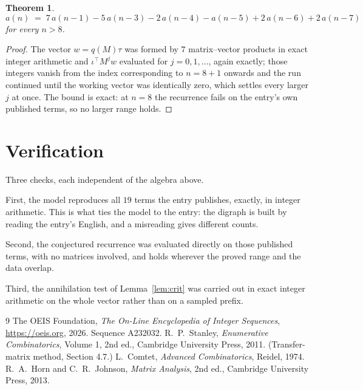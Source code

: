 \documentclass[11pt,a4paper]{article}
\theoremstyle{plain}
\newtheorem{theorem}{Theorem}
\theoremstyle{definition}
\begin{document}
\begin{theorem}
\[
a(n)\;=\;7\,a(n-1) - 5\,a(n-3) - 2\,a(n-4) - a(n-5) + 2\,a(n-6) + 2\,a(n-7)
\]
for every $n>8$.
\end{theorem}

\begin{proof}
The vector $w=q(M)\tau$ was formed by $7$ matrix--vector products in exact integer
arithmetic and $\iota^{\!\top}M^{j}w$ evaluated for $j=0,1,\dots$, again exactly; those
integers vanish from the index corresponding to $n=8+1$ onwards and the run continued
until the working vector was identically zero, which settles every larger $j$ at once. The bound is exact: at $n=8$ the recurrence fails on the entry's own published terms, so no larger range holds.
\end{proof}

\section{Verification}

Three checks, each independent of the algebra above.

First, the model reproduces all $19$ terms the entry publishes, exactly, in integer
arithmetic. This is what ties the model to the entry: the digraph is built by reading the
entry's English, and a misreading gives different counts.

Second, the conjectured recurrence was evaluated directly on those published terms, with no
matrices involved, and holds wherever the proved range and the data overlap.

Third, the annihilation test of Lemma~\ref{lem:crit} was carried out in exact integer
arithmetic on the whole vector rather than on a sampled prefix.

\begin{thebibliography}{9}
 The OEIS Foundation, \emph{The On-Line Encyclopedia of Integer
Sequences}, \url{https://oeis.org}, 2026. Sequence A232032.
 R.~P.~Stanley, \emph{Enumerative Combinatorics}, Volume 1, 2nd ed.,
Cambridge University Press, 2011. (Transfer-matrix method, Section 4.7.)
 L.~Comtet, \emph{Advanced Combinatorics}, Reidel, 1974.
 R.~A.~Horn and C.~R.~Johnson, \emph{Matrix Analysis}, 2nd ed., Cambridge
University Press, 2013.
\end{thebibliography}
\end{document}

